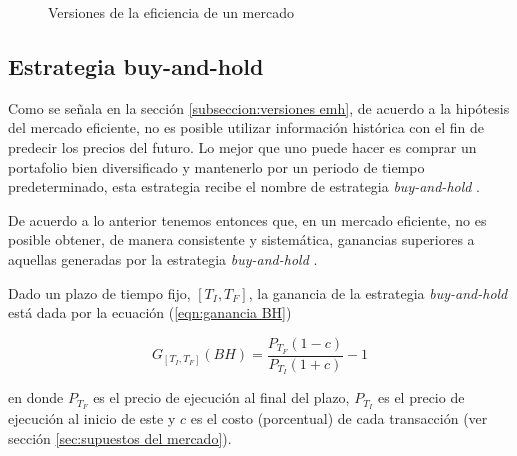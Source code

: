 \documentclass[12pt]{scrbook}
\theoremstyle{break}
\theoremstyle{break}
\newcommand{\buyhold}{\textit{buy-and-hold} }
\begin{document}
\begin{figure}[ht]
\centering
{}
\caption{\label{imagen:versiones emh} Versiones de la eficiencia de un mercado}
\end{figure}


\subsection{Estrategia buy-and-hold}
\label{seccion:buy and hold}
Como se señala en la sección \ref{subseccion:versiones emh}, de acuerdo a la hipótesis del mercado eficiente, no es posible utilizar información histórica con el fin de predecir los precios del futuro. Lo mejor que uno puede hacer es comprar un portafolio bien diversificado y mantenerlo por un periodo de tiempo predeterminado, esta estrategia recibe el nombre de estrategia \buyhold.

De acuerdo a lo anterior tenemos entonces que, en un mercado eficiente, no es posible obtener, de manera consistente y sistemática, ganancias superiores a aquellas generadas por la estrategia \buyhold.

Dado un plazo de tiempo fijo, $\left[T_{I}, T_{F}\right]$, la ganancia de la estrategia \buyhold está dada por la ecuación (\ref{eqn:ganancia BH})

\begin{equation} \label{eqn:ganancia BH}
G_{\left[T_{I}, T_{F}\right]} (BH) = \dfrac{P_{T_F} (1 - c) } { P_{T_I} (1 + c) } - 1
\end{equation}

en donde $P_{T_F}$ es el precio de ejecución al final del plazo, $P_{T_I}$ es el precio de ejecución al inicio de este y $c$ es el costo (porcentual) de cada transacción (ver sección \ref{sec:supuestos del mercado}). 
\end{document}
